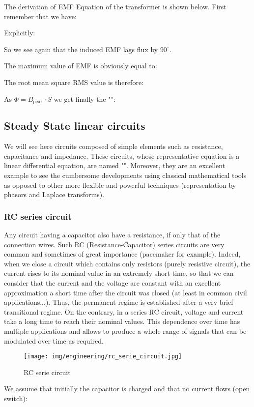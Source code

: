 	The derivation of EMF Equation of the transformer is shown below. First remember that we have:
	
	Explicitly:
	
	So we see again that the induced EMF lags flux by $90^\circ$.

	The maximum value of EMF is obviously equal to:
	
	The root mean square RMS value is therefore:
	
	As $\Phi=B_\text{peak}\cdot S$ we get finally the "":
	
	
	\pagebreak
	\subsection{Steady State linear circuits}
	We will see here circuits composed of simple elements such as resistance, capacitance and impedance. These circuits, whose representative equation is a linear differential equation, are named "". Moreover, they are an excellent example to see the cumbersome developments using classical mathematical tools as opposed to other more flexible and powerful techniques (representation by phasors and Laplace transforms).
	
	\subsubsection{RC series circuit}\label{rc series circuit}
	Any circuit having a capacitor also have a resistance, if only that of the connection wires. Such RC (Resistance-Capacitor) series circuits are very common and sometimes of great importance (pacemaker for example). Indeed, when we close a circuit which contains only resistors (purely resistive circuit), the current rises to its nominal value in an extremely short time, so that we can consider that the current and the voltage are constant with an excellent approximation a short time after the circuit was closed (at least in common civil applications...). Thus, the permanent regime is established after a very brief transitional regime. On the contrary, in a series RC circuit, voltage and current take a long time to reach their nominal values. This dependence over time has multiple applications and allows to produce a whole range of signals that can be modulated over time as required.
	\begin{figure}[H]
		\centering
		\texttt{[image: img/engineering/rc\_serie\_circuit.jpg]}
		\caption{RC serie circuit}
	\end{figure}
	We assume that initially the capacitor is charged and that no current flows (open switch):
	
